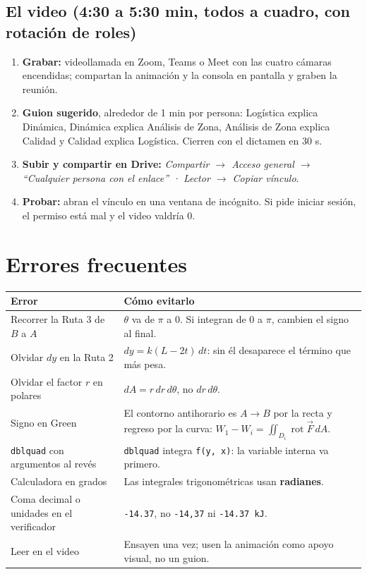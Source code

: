 \documentclass[11pt,letterpaper]{article}
\begin{document}
\subsection*{El video (4:30 a 5:30 min, todos a cuadro, con rotación de roles)}
\begin{enumerate}
\item \textbf{Grabar:} videollamada en Zoom, Teams o Meet con las cuatro cámaras encendidas; compartan la animación y la consola en pantalla y graben la reunión.
\item \textbf{Guion sugerido}, alrededor de 1 min por persona: Logística explica Dinámica, Dinámica explica Análisis de Zona, Análisis de Zona explica Calidad y Calidad explica Logística. Cierren con el dictamen en 30 s.
\item \textbf{Subir y compartir en Drive:} \emph{Compartir \(\rightarrow\) Acceso general \(\rightarrow\) ``Cualquier persona con el enlace'' · Lector \(\rightarrow\) Copiar vínculo}.
\item \textbf{Probar:} abran el vínculo en una ventana de incógnito. Si pide iniciar sesión, el permiso está mal y el video valdría 0.
\end{enumerate}

\section{Errores frecuentes}
\begin{center}\small
\begin{tabularx}{\linewidth}{@{}>{\raggedright\arraybackslash}p{5.2cm} Y@{}}\toprule
\textbf{Error} & \textbf{Cómo evitarlo}\\\midrule
Recorrer la Ruta 3 de \(B\) a \(A\) & \(\theta\) va de \(\pi\) a \(0\). Si integran de \(0\) a \(\pi\), cambien el signo al final. \\
Olvidar \(dy\) en la Ruta 2 & \(dy=k(L-2t)\,dt\): sin él desaparece el término que más pesa. \\
Olvidar el factor \(r\) en polares & \(dA=r\,dr\,d\theta\), no \(dr\,d\theta\). \\
Signo en Green & El contorno antihorario es \(A\to B\) por la recta y regreso por la curva: \(W_1-W_i=\iint_{D_i}\operatorname{rot}\vec F\,dA\). \\
\texttt{dblquad} con argumentos al revés & \texttt{dblquad} integra \texttt{f(y, x)}: la variable interna va primero. \\
Calculadora en grados & Las integrales trigonométricas usan \textbf{radianes}. \\
Coma decimal o unidades en el verificador & \texttt{-14.37}, no \texttt{-14,37} ni \texttt{-14.37 kJ}. \\
Leer en el video & Ensayen una vez; usen la animación como apoyo visual, no un guion. \\ \bottomrule
\end{tabularx}\end{center}
\end{document}
